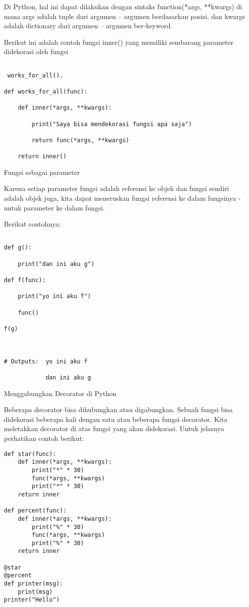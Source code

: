 \documentclass[12pt,a4paper]{article}
\begin{document}
Di Python, hal ini dapat dilakukan dengan sintaks function(*args, **kwargs) di mana args adalah tuple dari argumen – argumen berdasarkan posisi, dan kwargs adalah dictionary dari argumen – argumen ber-keyword.

Berikut ini adalah contoh fungsi inner() yang memiliki sembarang parameter didekorasi oleh fungsi

\begin{verbatim}

 works_for_all().

def works_for_all(func):

    def inner(*args, **kwargs):

        print("Saya bisa mendekorasi fungsi apa saja")

        return func(*args, **kwargs)

    return inner()

\end{verbatim}



Fungsi sebagai parameter

Karena setiap parameter fungsi adalah referensi ke objek dan fungsi sendiri adalah objek juga, kita dapat meneruskan fungsi referensi ke dalam fungsinya - untuk parameter ke dalam fungsi.

Berikut contohnya: 

\begin{verbatim}

def g():

    print("dan ini aku g")

def f(func):

    print("yo ini aku f")

    func() 

f(g)



# Outputs: 	yo ini aku f

			dan ini aku g

\end{verbatim}

Menggabungkan Decorator di Python

Beberapa decorator bisa dihubungkan atau digabungkan. Sebuah fungsi bisa didekorasi beberapa kali dengan satu atau beberapa fungsi decorator. Kita meletakkan decorator di atas fungsi yang akan didekorasi. Untuk jelasnya perhatikan contoh berikut:
\begin{verbatim}
def star(func):
    def inner(*args, **kwargs):
        print("*" * 30)
        func(*args, **kwargs)
        print("*" * 30)
    return inner

def percent(func):
    def inner(*args, **kwargs):
        print("%" * 30)
        func(*args, **kwargs)
        print("%" * 30)
    return inner

@star
@percent
def printer(msg):
    print(msg)
printer("Hello")
\end{verbatim}
\end{document}
